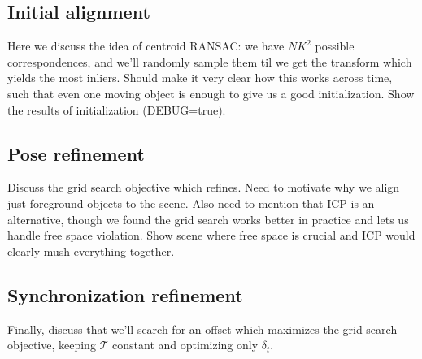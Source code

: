 \documentclass[letterpaper, 10 pt, conference]{ieeeconf}  %
\begin{document}
\subsection{Initial alignment}
Here we discuss the idea of centroid RANSAC: we have $NK^2$ possible correspondences, and we'll randomly sample
them til we get the transform which yields the most inliers. Should make it very clear how this works across 
time, such that even one moving object is enough to give us a good initialization. Show the results of 
initialization (DEBUG=true).

\subsection{Pose refinement}
Discuss the grid search objective which refines. Need to motivate why we align just foreground objects to the scene. 
Also need to mention that ICP is an alternative, though we found the grid search works better in practice and lets 
us handle free space violation. Show scene where free space is crucial and ICP would clearly mush everything 
together.

\subsection{Synchronization refinement}
Finally, discuss that we'll search for an offset which maximizes the grid search objective, keeping $\mathcal{T}$ 
constant and optimizing only $\delta_t$. 



%
%
%
\end{document}
